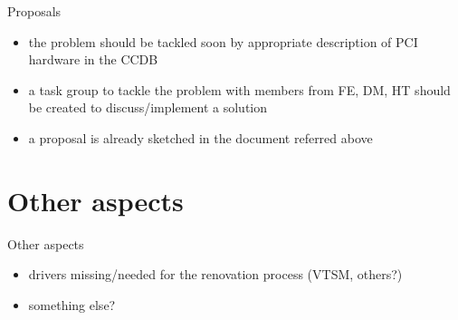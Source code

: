 \documentclass[compress,red]{beamer}
\begin{document}
\begin{frame}{Proposals}
\begin{itemize}
\pause
\item the problem should be tackled soon by appropriate description
	of PCI hardware in the CCDB
\pause
\item a task group to tackle the problem with members from
	FE, DM, HT should be created to discuss/implement a solution
\pause
\item a proposal is already sketched in the document referred above
\end{itemize}
\end{frame}

\section{Other aspects}

\begin{frame}{Other aspects}
\begin{itemize}
\pause
\item drivers missing/needed for the renovation process (VTSM, others?)
\pause
\item something else?
\end{itemize}
\end{frame}
\end{document}
